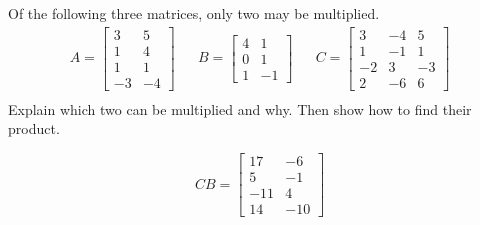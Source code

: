 
\begin{exerciseStatement}


Of the following three matrices, only two may be multiplied. 
\begin{align*} A= \left[\begin{array}{cc}
3 & 5 \\
1 & 4 \\
1 & 1 \\
-3 & -4
\end{array}\right]  & & B= \left[\begin{array}{cc}
4 & 1 \\
0 & 1 \\
1 & -1
\end{array}\right]  & & C= \left[\begin{array}{ccc}
3 & -4 & 5 \\
1 & -1 & 1 \\
-2 & 3 & -3 \\
2 & -6 & 6
\end{array}\right]  \\ \end{align*}
             Explain which two can be multiplied and why. Then show how to find their product.


\end{exerciseStatement}
    
\begin{exerciseAnswer} 
\[CB= \left[\begin{array}{cc}
17 & -6 \\
5 & -1 \\
-11 & 4 \\
14 & -10
\end{array}\right] \]
\end{exerciseAnswer}
    
